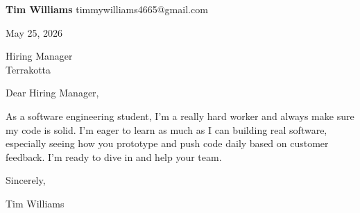 \documentclass[12pt]{article}
\begin{document}
\textbf{Tim Williams} \hfill timmywilliams4665@gmail.com

\vspace{1em}

May 25, 2026

\vspace{1em}

Hiring Manager \\
Terrakotta

\vspace{1em}

Dear Hiring Manager,

As a software engineering student, I'm a really hard worker and always make sure my code is solid. I'm eager to learn as much as I can building real software, especially seeing how you prototype and push code daily based on customer feedback. I'm ready to dive in and help your team.

\vspace{1em}

Sincerely,

\vspace{2em}

Tim Williams
\end{document}
